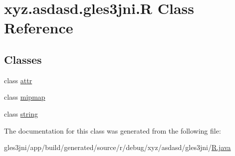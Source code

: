 \hypertarget{classxyz_1_1asdasd_1_1gles3jni_1_1_r}{}\section{xyz.\+asdasd.\+gles3jni.\+R Class Reference}
\label{classxyz_1_1asdasd_1_1gles3jni_1_1_r}
\subsection*{Classes}
\begin{DoxyCompactItemize}
\item 
class \hyperlink{classxyz_1_1asdasd_1_1gles3jni_1_1_r_1_1attr}{attr}
\item 
class \hyperlink{classxyz_1_1asdasd_1_1gles3jni_1_1_r_1_1mipmap}{mipmap}
\item 
class \hyperlink{classxyz_1_1asdasd_1_1gles3jni_1_1_r_1_1string}{string}
\end{DoxyCompactItemize}


The documentation for this class was generated from the following file\+:\begin{DoxyCompactItemize}
\item 
gles3jni/app/build/generated/source/r/debug/xyz/asdasd/gles3jni/\hyperlink{_r_8java}{R.\+java}\end{DoxyCompactItemize}
